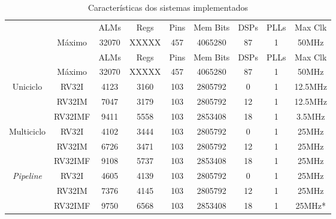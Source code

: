    \vspace{0.2cm}
    \begin{longtable}{cc|c|c|c|c|c|c|c|}
        \caption{Características dos sistemas implementados}\label{table:synth_resources}\\
        \cline{3-9}
                                                                &                               & ALMs  & Regs  & Pins  & Mem Bits  & DSPs  & PLLs  & Max Clk   \\
        \cline{2-9}
                                                                & \multicolumn{1}{|c|}{Máximo}  & 32070 & XXXXX & 457   & 4065280   & 87    & 1     & 50MHz     \\
        \hline
        \endfirsthead
        \cline{3-9}
                                                                &                               & ALMs  & Regs  & Pins  & Mem Bits  & DSPs  & PLLs  & Max Clk   \\
        \cline{2-9}
                                                                & \multicolumn{1}{|c|}{Máximo}  & 32070 & XXXXX & 457   & 4065280   & 87    & 1     & 50MHz     \\
        \hline
        \endhead
        \multicolumn{1}{|c}{\multirow{3}{*}{{Uniciclo}}}        & \multicolumn{1}{|c|}{RV32I}   & 4123  & 3160  & 103   & 2805792   & 0     & 1     & 12.5MHz   \\*
        \cline{2-9}
        \multicolumn{1}{|c}{ }                                  & \multicolumn{1}{|c|}{RV32IM}  & 7047  & 3179  & 103   & 2805792   & 12    & 1     & 12.5MHz   \\*
        \cline{2-9}
        \multicolumn{1}{|c}{ }                                  & \multicolumn{1}{|c|}{RV32IMF} & 9411  & 5558  & 103   & 2853408   & 18    & 1     & 3.5MHz    \\
        \hline
        \multicolumn{1}{|c}{\multirow{3}{*}{{Multiciclo}}}      & \multicolumn{1}{|c|}{RV32I}   & 4102  & 3444  & 103   & 2805792   & 0     & 1     & 25MHz     \\*
        \cline{2-9}
        \multicolumn{1}{|c}{ }                                  & \multicolumn{1}{|c|}{RV32IM}  & 6726  & 3471  & 103   & 2805792   & 12    & 1     & 25MHz     \\*
        \cline{2-9}
        \multicolumn{1}{|c}{ }                                  & \multicolumn{1}{|c|}{RV32IMF} & 9108  & 5737  & 103   & 2853408   & 18    & 1     & 25MHz     \\
        \hline
        \multicolumn{1}{|c}{\multirow{3}{*}{\textit{Pipeline}}} & \multicolumn{1}{|c|}{RV32I}   & 4605  & 4139  & 103   & 2805792   & 0     & 1     & 25MHz     \\*
        \cline{2-9}
        \multicolumn{1}{|c}{ }                                  & \multicolumn{1}{|c|}{RV32IM}  & 7376  & 4145  & 103   & 2805792   & 12    & 1     & 25MHz     \\*
        \cline{2-9}
        \multicolumn{1}{|c}{ }                                  & \multicolumn{1}{|c|}{RV32IMF} & 9750  & 6568  & 103   & 2853408   & 18    & 1     & 25MHz*    \\
        \hline
    \end{longtable}

